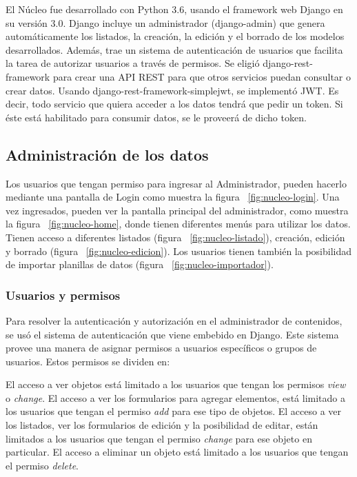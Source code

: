 El Núcleo fue desarrollado con Python 3.6, usando el framework web Django en su versión 3.0.
Django incluye un administrador (django-admin) que genera automáticamente los listados, la creación, la edición y el borrado de los modelos desarrollados. Además, trae un sistema de autenticación de usuarios que facilita la tarea de autorizar usuarios a través de permisos.
Se eligió django-rest-framework para crear una API REST para que otros servicios puedan consultar o crear datos.
Usando django-rest-framework-simplejwt, se implementó JWT. Es decir, todo servicio que quiera acceder a los datos tendrá que pedir un token. Si éste está habilitado para consumir datos, se le proveerá de dicho token.

\subsection{Administración de los datos}

Los usuarios que tengan permiso para ingresar al Administrador, pueden hacerlo mediante una pantalla de Login como muestra la figura ~\ref{fig:nucleo-login}.
Una vez ingresados, pueden ver la pantalla principal del administrador, como muestra la figura ~\ref{fig:nucleo-home}, donde tienen diferentes menús para utilizar los datos. Tienen acceso a diferentes listados (figura ~\ref{fig:nucleo-listado}), creación, edición y borrado (figura ~\ref{fig:nucleo-edicion}).
Los usuarios tienen también la posibilidad de importar planillas de datos (figura ~\ref{fig:nucleo-importador}).

\subsubsection{Usuarios y permisos}

Para resolver la autenticación y autorización en el administrador de contenidos, se usó el sistema de autenticación que viene embebido en Django.
Este sistema provee una manera de asignar permisos a usuarios específicos o grupos de usuarios. Estos permisos se dividen en:
\begin{outline}
    \1 El acceso a ver objetos está limitado a los usuarios que tengan los permisos \textit{view} o \textit{change}.
    \1 El acceso a ver los formularios para agregar elementos, está limitado a los usuarios que tengan el permiso \textit{add} para ese tipo de objetos.
    \1 El acceso a ver los listados, ver los formularios de edición y la posibilidad de editar, están limitados a los usuarios que tengan el permiso \textit{change} para ese objeto en particular.
    \1 El acceso a eliminar un objeto está limitado a los usuarios que tengan el permiso \textit{delete}.
\end{outline}

